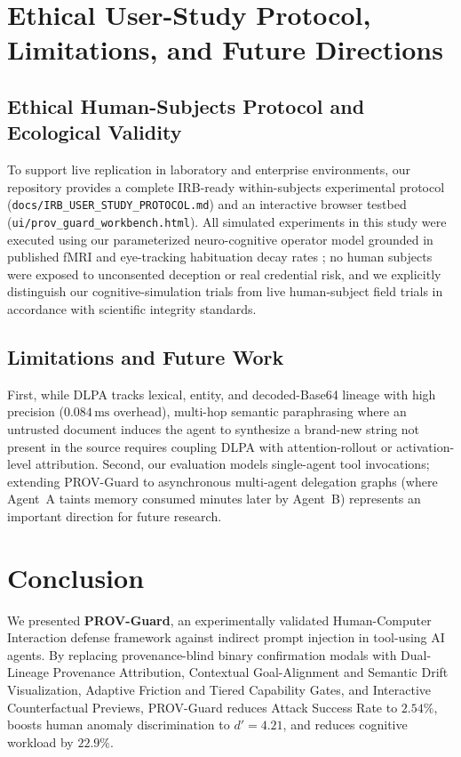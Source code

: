 \documentclass[10pt,twocolumn,letterpaper]{article}
\begin{document}
\section{Ethical User-Study Protocol, Limitations, and Future Directions}

\subsection{Ethical Human-Subjects Protocol and Ecological Validity}
To support live replication in laboratory and enterprise environments, our repository provides a complete IRB-ready within-subjects experimental protocol (\texttt{docs/IRB\_USER\_STUDY\_PROTOCOL.md}) and an interactive browser testbed (\texttt{ui/prov\_guard\_workbench.html}). All simulated experiments in this study were executed using our parameterized neuro-cognitive operator model grounded in published fMRI and eye-tracking habituation decay rates \cite{anderson2016polymorphic, vance2018habituation, jenkins2025fog}; no human subjects were exposed to unconsented deception or real credential risk, and we explicitly distinguish our cognitive-simulation trials from live human-subject field trials in accordance with scientific integrity standards.

\subsection{Limitations and Future Work}
First, while DLPA tracks lexical, entity, and decoded-Base64 lineage with high precision ($0.084\,\text{ms}$ overhead), multi-hop semantic paraphrasing where an untrusted document induces the agent to synthesize a brand-new string not present in the source requires coupling DLPA with attention-rollout or activation-level attribution. Second, our evaluation models single-agent tool invocations; extending PROV-Guard to asynchronous multi-agent delegation graphs (where Agent~A taints memory consumed minutes later by Agent~B) represents an important direction for future research.

\section{Conclusion}
We presented \textbf{PROV-Guard}, an experimentally validated Human-Computer Interaction defense framework against indirect prompt injection in tool-using AI agents. By replacing provenance-blind binary confirmation modals with Dual-Lineage Provenance Attribution, Contextual Goal-Alignment and Semantic Drift Visualization, Adaptive Friction and Tiered Capability Gates, and Interactive Counterfactual Previews, PROV-Guard reduces Attack Success Rate to $2.54\%$, boosts human anomaly discrimination to $d' = 4.21$, and reduces cognitive workload by $22.9\%$.
\end{document}
